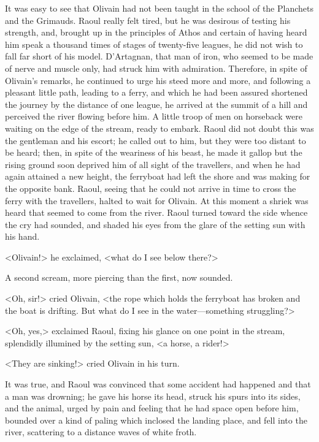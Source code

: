 It was easy to see that Olivain had not been taught in the school of the Planchets and the Grimauds. Raoul really felt tired, but he was desirous of testing his strength, and, brought up in the principles of Athos and certain of having heard him speak a thousand times of stages of twenty-five leagues, he did not wish to fall far short of his model. D'Artagnan, that man of iron, who seemed to be made of nerve and muscle only, had struck him with admiration. Therefore, in spite of Olivain's remarks, he continued to urge his steed more and more, and following a pleasant little path, leading to a ferry, and which he had been assured shortened the journey by the distance of one league, he arrived at the summit of a hill and perceived the river flowing before him. A little troop of men on horseback were waiting on the edge of the stream, ready to embark. Raoul did not doubt this was the gentleman and his escort; he called out to him, but they were too distant to be heard; then, in spite of the weariness of his beast, he made it gallop but the rising ground soon deprived him of all sight of the travellers, and when he had again attained a new height, the ferryboat had left the shore and was making for the opposite bank. Raoul, seeing that he could not arrive in time to cross the ferry with the travellers, halted to wait for Olivain. At this moment a shriek was heard that seemed to come from the river. Raoul turned toward the side whence the cry had sounded, and shaded his eyes from the glare of the setting sun with his hand.

<Olivain!> he exclaimed, <what do I see below there?>

A second scream, more piercing than the first, now sounded.

<Oh, sir!> cried Olivain, <the rope which holds the ferryboat has broken and the boat is drifting. But what do I see in the water—something struggling?>

<Oh, yes,> exclaimed Raoul, fixing his glance on one point in the stream, splendidly illumined by the setting sun, <a horse, a rider!>

<They are sinking!> cried Olivain in his turn.

It was true, and Raoul was convinced that some accident had happened and that a man was drowning; he gave his horse its head, struck his spurs into its sides, and the animal, urged by pain and feeling that he had space open before him, bounded over a kind of paling which inclosed the landing place, and fell into the river, scattering to a distance waves of white froth.


